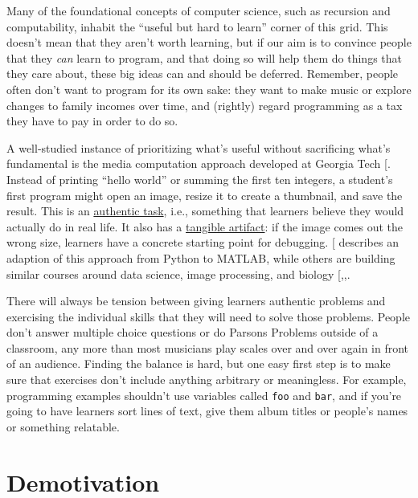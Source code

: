 Many of the foundational concepts of computer science, such as recursion
and computability, inhabit the ``useful but hard to learn'' corner of this
grid. This doesn't mean that they aren't worth learning, but if our aim
is to convince people that they \emph{can} learn to program, and that doing
so will help them do things that they care about, these big ideas can
and should be deferred. Remember, people often don't want to program for
its own sake: they want to make music or explore changes to family
incomes over time, and (rightly) regard programming as a tax they have
to pay in order to do so.

A well-studied instance of prioritizing what's useful without
sacrificing what's fundamental is the media computation approach
developed at Georgia Tech {[}\protect[\hyperlink{b:Guzd2013}{Guzd2013}]{]}. Instead of printing ``hello
world'' or summing the first ten integers, a student's first program
might open an image, resize it to create a thumbnail, and save the
result. This is an \protect\hyperlink{g:authentic-task}{authentic task}, i.e.,
something that learners believe they would actually do in real life. It
also has a \protect\hyperlink{g:tangible-artifact}{tangible artifact}: if the
image comes out the wrong size, learners have a concrete starting point
for debugging. {[}\protect[\hyperlink{b:Lee2013}{Lee2013}]{]} describes an adaption of this approach
from Python to MATLAB, while others are building similar courses around
data science, image processing, and biology
{[},,\protect[\hyperlink{b:Ritz2018}{Ritz2018}]{]}.

There will always be tension between giving learners authentic problems
and exercising the individual skills that they will need to solve those
problems. People don't answer multiple choice questions or do Parsons
Problems outside of a classroom, any more than most musicians play
scales over and over again in front of an audience. Finding the balance
is hard, but one easy first step is to make sure that exercises don't
include anything arbitrary or meaningless. For example, programming
examples shouldn't use variables called \texttt{foo} and \texttt{bar}, and if you're
going to have learners sort lines of text, give them album titles or
people's names or something relatable.

\section{Demotivation}\label{s:motivation-demotivation}

